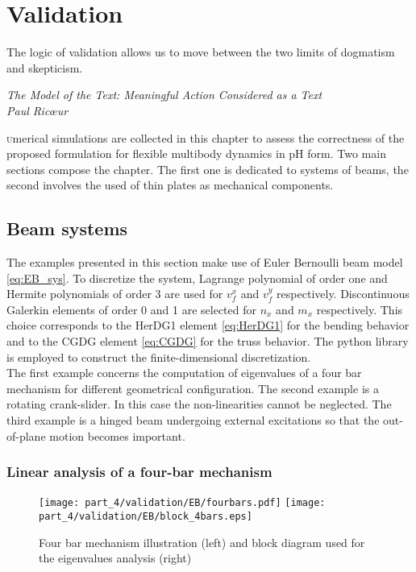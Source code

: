 \chapter{Validation}\label{ch:valid}

\epigraph{The logic of validation allows us to move between the two limits of dogmatism and skepticism.}{\textit{The Model of the Text: Meaningful Action Considered as a Text\\
Paul Ric\oe{}ur}}

\minitoc

\lettrine{\color{theme}{N}}umerical simulations are collected in this chapter to assess the correctness of the proposed formulation for flexible multibody dynamics in pH form. Two main sections compose the chapter. The first one is dedicated to systems of beams, the second involves the used of thin plates as mechanical components.

\section{Beam systems}
The examples presented in this section make use of Euler Bernoulli beam model \eqref{eq:EB_sys}. To discretize the system, Lagrange polynomial of order one and Hermite polynomials of order 3 are used for $v_f^x$ and $v_f^y$ respectively. Discontinuous Galerkin elements of order 0 and 1 are selected for $n_x$ and $m_{x}$ respectively. This choice corresponds to the HerDG1 element \eqref{eq:HerDG1} for the bending behavior and to the CGDG element \eqref{eq:CGDG} for the truss behavior. The {} python library \cite{rathgeber2017firedrake} is employed to construct the finite-dimensional discretization.  \\
 
The first example concerns the computation of eigenvalues of a four bar mechanism for different geometrical configuration. The second example is a rotating crank-slider. In this case the non-linearities cannot be neglected. The third example is a hinged beam undergoing external excitations so that the out-of-plane motion becomes important.   


\subsection{Linear analysis of a four-bar mechanism}

\begin{figure}[tb]
	\centering
	\texttt{[image: part\_4/validation/EB/fourbars.pdf]} 
	\texttt{[image: part\_4/validation/EB/block\_4bars.eps]} 
	\caption{Four bar mechanism illustration (left) and block diagram used for the eigenvalues analysis (right)}
	\label{fig:4bars}
\end{figure}

